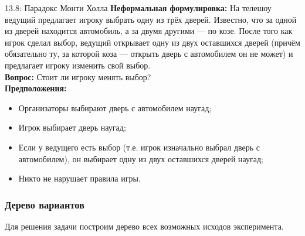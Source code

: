 \documentclass[a4paper,12pt]{article}
\begin{document}
	\begin{examplebox}{13.8: Парадокс Монти Холла}
		\textbf{Неформальная формулировка:} На телешоу ведущий предлагает игроку выбрать одну из трёх дверей. Известно, что за одной из дверей находится автомобиль, а за двумя другими — по козе. После того как игрок сделал выбор, ведущий открывает одну из двух оставшихся дверей (причём обязательно ту, за которой коза — открыть дверь с автомобилем он не может) и предлагает игроку изменить свой выбор. \\
		
		\textbf{Вопрос:} Стоит ли игроку менять выбор? \\
		
		\textbf{Предположения:}
		\begin{itemize}
			\item Организаторы выбирают дверь с автомобилем наугад;
			\item Игрок выбирает дверь наугад;
			\item Если у ведущего есть выбор (т.е. игрок изначально выбрал дверь с автомобилем), он выбирает одну из двух оставшихся дверей наугад;
			\item Никто не нарушает правила игры.
		\end{itemize}
	\end{examplebox}
	
	\subsubsection{Дерево вариантов}
	
	Для решения задачи построим дерево всех возможных исходов эксперимента.
	
\end{document}

